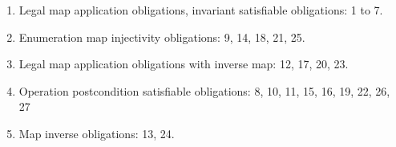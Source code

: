 \begin{enumerate}
\item
Legal map application obligations, invariant satisfiable obligations: 1 to 7.
\item
Enumeration map injectivity obligations: 9, 14, 18, 21, 25.
\item
Legal map application obligations with inverse map: 12, 17, 20, 23.
\item
Operation postcondition satisfiable obligations: 8, 10, 11, 15, 16, 19, 22, 26, 27
\item
Map inverse obligations: 13, 24.
\end{enumerate}


